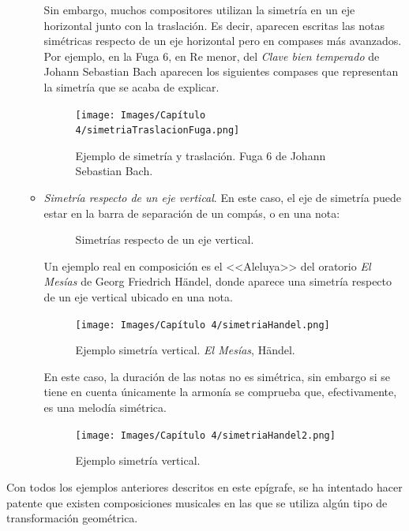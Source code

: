 \documentclass[a4paper, openright, 11pt, titlepage]{report}
\theoremstyle{definition}\newtheorem{defin}[propo]{Definition}
\theoremstyle{definition}\newtheorem{obser}[propo]{Remark}
\theoremstyle{definition}\newtheorem{ejem}[propo]{Ejemplo}
\theoremstyle{definition}\newtheorem{algoritmo}[propo]{Algoritmo}
\begin{document}
\begin{itemize}
\begin{itemize}
\begin{figure}[H]
        \end{figure}
        Sin embargo, muchos compositores utilizan la simetría en un eje horizontal junto con la traslación. Es decir, aparecen escritas las notas simétricas respecto de un eje horizontal pero en compases más avanzados. Por ejemplo, en la Fuga 6, en Re menor, del \textit{Clave bien temperado} de Johann Sebastian Bach aparecen los siguientes compases que representan la simetría que se acaba de explicar. 
        \begin{figure}[H]
            \centering
            \texttt{[image: Images/Capítulo 4/simetriaTraslacionFuga.png]}
            \caption{Ejemplo de simetría y traslación. Fuga 6 de Johann Sebastian Bach.}
        \end{figure}
        \item \textit{Simetría respecto de un eje vertical}. En este caso, el eje de simetría puede estar en la barra de separación de un compás, o en una nota:
        \begin{figure}[H]
        \centering
         \hspace{0.5cm}
        \caption{Simetrías respecto de un eje vertical.}
        \end{figure}
        Un ejemplo real en composición es el <<Aleluya>> del oratorio \textit{El Mesías} de Georg Friedrich Händel, donde aparece una simetría respecto de un eje vertical ubicado en una nota.
        \begin{figure}[H]
            \centering
            \texttt{[image: Images/Capítulo 4/simetriaHandel.png]}
            \caption{Ejemplo simetría vertical. \textit{El Mesías}, Händel.}
            \label{aleluya}
        \end{figure}
        En este caso, la duración de las notas no es simétrica, sin embargo si se tiene en cuenta únicamente la armonía se comprueba que, efectivamente, es una melodía simétrica.
        \begin{figure}[H]
            \centering
            \texttt{[image: Images/Capítulo 4/simetriaHandel2.png]}
            \caption{Ejemplo simetría vertical.}
        \end{figure}       
    \end{itemize}
\end{itemize}
Con todos los ejemplos anteriores descritos en este epígrafe, se ha intentado hacer patente que existen composiciones musicales en las que se utiliza algún tipo de transformación geométrica.
    
\end{document}
